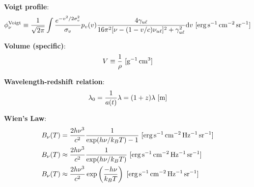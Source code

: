 \documentclass[a4paper,10pt]{article}
\begin{document}
{\noindent}\textbf{Voigt profile}:
\begin{align*}
    \phi_\nu^{\rm Voigt} \equiv \frac{1}{\sqrt{2\pi}} \int \frac{e^{-v^2/2\sigma_v^2}}{\sigma_v} p_v(v) \frac{4\gamma_{u\ell}}{16\pi^2[\nu-(1-v/c)\nu_{u\ell}]^2 + \gamma_{u\ell}^2}{\rm d}v  ~ [{\rm erg\,s^{-1}\,cm^{-2}\,sr^{-1}}]
\end{align*}

{\noindent}\textbf{Volume (specific)}:
\begin{align*}
    V \equiv \frac{1}{\rho}~ [{\rm g^{-1}\,cm^3}]
\end{align*}

{\noindent}\textbf{Wavelength-redshift relation}:
\begin{align*}
    \lambda_0 = \frac{1}{a(t)}\lambda = (1+z)\lambda ~ [{\rm m}]
\end{align*}

{\noindent}\textbf{Wien's Law}:
\begin{align*}
    B_\nu(T) &= \frac{2h\nu^3}{c^2} \frac{1}{\exp(h\nu/k_BT) - 1} ~ [{\rm erg\,s^{-1}\,cm^{-2}\,Hz^{-1}\,sr^{-1}}] \\
    B_\nu(T) &\approx \frac{2h\nu^3}{c^2} \frac{1}{\exp(h\nu/k_BT)} ~ [{\rm erg\,s^{-1}\,cm^{-2}\,Hz^{-1}\,sr^{-1}}] \\
    B_\nu(T) &\approx \frac{2h\nu^3}{c^2} \exp\left(\frac{-h\nu}{k_BT}\right) ~ [{\rm erg\,s^{-1}\,cm^{-2}\,Hz^{-1}\,sr^{-1}}]
\end{align*}






































\end{document}
